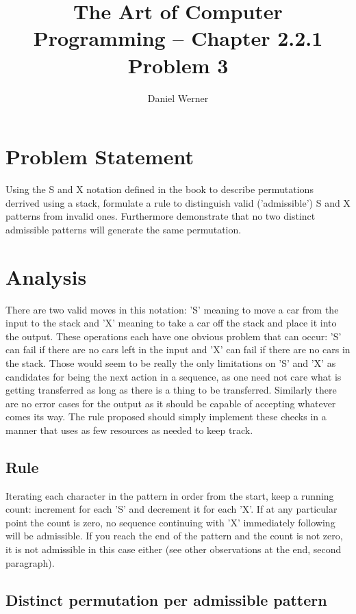 \documentclass{article}
\title{The Art of Computer Programming -- Chapter 2.2.1 Problem 3}
\author{Daniel Werner}
\begin{document}
\maketitle

\section*{
    Problem Statement
}

Using the S and X notation defined in the book to describe permutations derrived using a stack, formulate a rule to distinguish valid ('admissible') S and X patterns from invalid ones.  Furthermore demonstrate that no two distinct admissible patterns will generate the same permutation.

\section*{
    Analysis
}

There are two valid moves in this notation: 'S' meaning to move a car from the input to the stack and 'X' meaning to take a car off the stack and place it into the output.  These operations each have one obvious problem that can occur: 'S' can fail if there are no cars left in the input and 'X' can fail if there are no cars in the stack.  Those would seem to be really the only limitations on 'S' and 'X' as candidates for being the next action in a sequence, as one need not care what is getting transferred as long as there is a thing to be transferred.  Similarly there are no error cases for the output as it should be capable of accepting whatever comes its way.  The rule proposed should simply implement these checks in a manner that uses as few resources as needed to keep track.

\subsection*{Rule}

Iterating each character in the pattern in order from the start, keep a running count: increment for each 'S' and decrement it for each 'X'.  If at any particular point the count is zero, no sequence continuing with 'X' immediately following will be admissible.  If you reach the end of the pattern and the count is not zero, it is not admissible in this case either (see other observations at the end, second paragraph).

\subsection*{Distinct permutation per admissible pattern}
\end{document}
